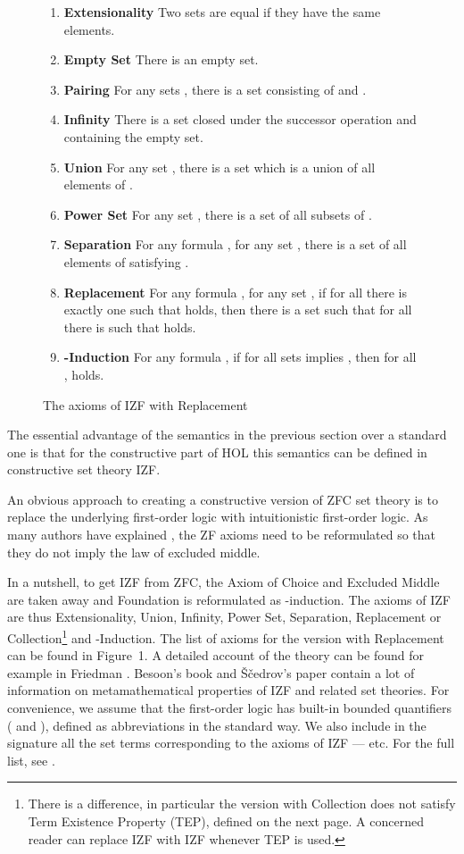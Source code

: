 \documentclass{LMCS}
\newcommand{\izfax}[1]{{\bf #1}}
\begin{document}
\begin{figure}[t]\label{f1}
\begin{enumerate}[]
\item \izfax{Extensionality} Two sets are equal if they have the same elements. 
\item \izfax{Empty Set} There is an empty set.
\item \izfax{Pairing} For any sets , there is a set consisting of  and .
\item \izfax{Infinity} There is a set closed under the successor operation
and containing the empty set. 
\item \izfax{Union} For any set , there is a set  which is a union of all elements of .
\item \izfax{Power Set} For any set , there is a set of all subsets of .
\item \izfax{Separation} For any formula , for any set , there is a set of all elements of
 satisfying . 
\item \izfax{Replacement} For any formula , for any set , if for all  there is
exactly one  such that  holds, then there is a set  such that
for all  there is  such that  holds.
\item \izfax{-Induction} For any formula , if for all sets  
 implies , then for all
,  holds. 
\end{enumerate}
\caption{The axioms of IZF with Replacement}
\end{figure}


The essential advantage of the semantics in the previous section over
a standard one is that for the constructive part of HOL this semantics can be
defined in constructive set theory IZF.

An obvious approach to creating a constructive version of ZFC set theory is
to replace the underlying first-order logic with intuitionistic first-order
logic. As many authors have explained \cite{Myhill73,Bee85,McCarty86,Sce85}, the
ZF axioms need to be reformulated so that they do not imply the law of excluded
middle.  

In a nutshell, to get IZF from ZFC, the Axiom of Choice and Excluded Middle
are taken away and Foundation is reformulated as -induction. The axioms of IZF are thus Extensionality, Union, Infinity, 
Power Set, Separation, Replacement or Collection\footnote{There is a
difference, in particular the version with Collection does not satisfy Term
Existence Property (TEP), defined on the next page. A concerned reader can replace IZF with IZF whenever TEP is used. }
and -Induction. The list of axioms for the version with Replacement can be found in
Figure~1. 
A detailed account of the theory can be found for
example in Friedman \cite{Fri73}. Besoon's book \cite{Bee85} and
\v{S}\v{c}edrov's paper \cite{Sce85} contain a lot of information on metamathematical properties of IZF and related set theories. 
For convenience, we assume that the first-order logic has built-in bounded quantifiers
( and ), defined as
abbreviations in the standard way. We also include in the signature all the
set terms corresponding to the axioms of IZF ---  etc.
For the full list, see \cite{jalmcs07}. 
\end{document}
